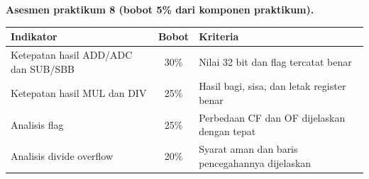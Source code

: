 \begin{asesmenbox}
\vspace{1.1em}
\textbf{Asesmen praktikum 8 (bobot 5\% dari komponen praktikum).}

\begin{tabular}{@{}p{6.2cm}cp{4.6cm}@{}}
    \toprule
    \textbf{Indikator} & \textbf{Bobot} & \textbf{Kriteria} \\
    \midrule
    Ketepatan hasil ADD/ADC dan SUB/SBB & 30\% &
    Nilai 32 bit dan flag tercatat benar \\
    \addlinespace
    Ketepatan hasil MUL dan DIV & 25\% &
    Hasil bagi, sisa, dan letak register benar \\
    \addlinespace
    Analisis flag & 25\% &
    Perbedaan CF dan OF dijelaskan dengan tepat \\
    \addlinespace
    Analisis divide overflow & 20\% &
    Syarat aman dan baris pencegahannya dijelaskan \\
    \bottomrule
\end{tabular}
\end{asesmenbox}
